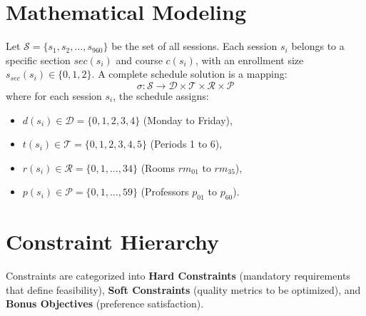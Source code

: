 \section{Mathematical Modeling}
Let $\mathcal{S} = \{s_1, s_2, \dots, s_{960}\}$ be the set of all sessions. Each session $s_i$ belongs to a specific section $sec(s_i)$ and course $c(s_i)$, with an enrollment size $s_{sec}(s_i) \in \{0, 1, 2\}$.
A complete schedule solution is a mapping:
\begin{equation}
  \sigma: \mathcal{S} \rightarrow \mathcal{D} \times \mathcal{T} \times \mathcal{R} \times \mathcal{P}
\end{equation}
where for each session $s_i$, the schedule assigns:
\begin{itemize}[leftmargin=1.5em]
  \item $d(s_i) \in \mathcal{D} = \{0, 1, 2, 3, 4\}$ (Monday to Friday),
  \item $t(s_i) \in \mathcal{T} = \{0, 1, 2, 3, 4, 5\}$ (Periods 1 to 6),
  \item $r(s_i) \in \mathcal{R} = \{0, 1, \dots, 34\}$ (Rooms $rm_{01}$ to $rm_{35}$),
  \item $p(s_i) \in \mathcal{P} = \{0, 1, \dots, 59\}$ (Professors $p_{01}$ to $p_{60}$).
\end{itemize}

\section{Constraint Hierarchy}
Constraints are categorized into \textbf{Hard Constraints} (mandatory requirements that define feasibility), \textbf{Soft Constraints} (quality metrics to be optimized), and \textbf{Bonus Objectives} (preference satisfaction).

